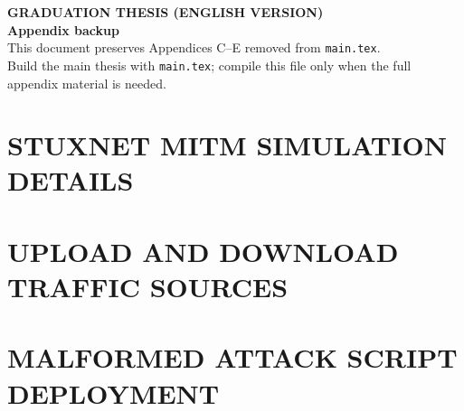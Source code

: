\documentclass[a4paper,13pt,3p,twoside]{report}
\begin{document}
\begin{center}
    {\LARGE\bfseries GRADUATION THESIS (ENGLISH VERSION)}\\[1em]
    {\large\bfseries Appendix backup}\\[0.5em]
    {\normalsize This document preserves Appendices C--E removed from \texttt{main.tex}.\\
    Build the main thesis with \texttt{main.tex}; compile this file only when the full appendix material is needed.}
\end{center}

\tableofcontents
\cleardoublepage

\appendix
\chapter{STUXNET MITM SIMULATION DETAILS}


\newpage
\chapter{UPLOAD AND DOWNLOAD TRAFFIC SOURCES}


\newpage
\chapter{MALFORMED ATTACK SCRIPT DEPLOYMENT}

\end{document}
